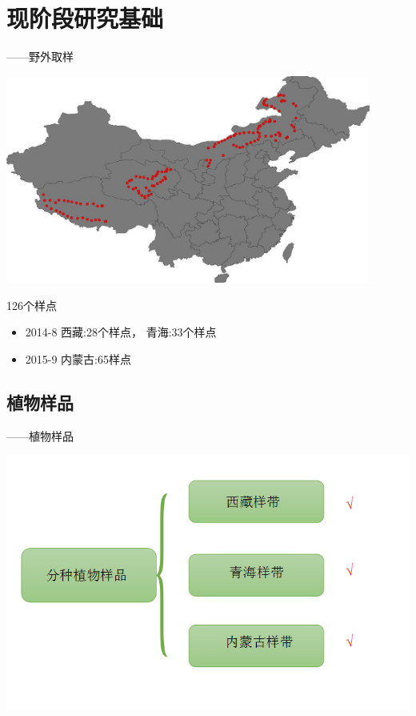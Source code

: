 \section{现阶段研究基础}
\begin{frame}{\insertsection——野外取样}
	\begin{center}
		\includegraphics[width = 0.9\textwidth]{./pic/3.1.jpg}
	\end{center}
	126个样点
	\begin{itemize}
		\item 2014-8	西藏:28个样点， 青海:33个样点
		\item 2015-9	内蒙古:65样点
	\end{itemize}
\end{frame}

\subsection{植物样品}
\begin{frame}{\insertsection——植物样品}
		\begin{center}
			\includegraphics[width = \textwidth]{./pic/3.2.png}
		\end{center}
\end{frame}
